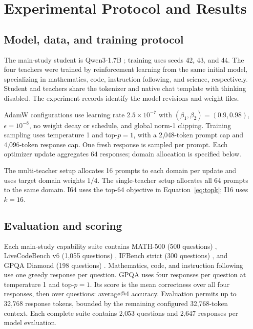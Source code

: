 \section{Experimental Protocol and Results}
\label{app:setup}

\subsection{Model, data, and training protocol}

The main-study student is Qwen3-1.7B \citep{qwen2025qwen3}; training uses seeds 42, 43, and 44. The four teachers were trained by reinforcement learning from the same initial model, specializing in mathematics, code, instruction following, and science, respectively. Student and teachers share the tokenizer and native chat template with thinking disabled. The experiment records identify the model revisions and weight files.

AdamW configurations use learning rate $2.5\times10^{-7}$ with $(\beta_1,\beta_2)=(0.9,0.98)$, $\epsilon=10^{-8}$, no weight decay or schedule, and global norm-1 clipping. Training sampling uses temperature 1 and top-$p=1$, with a 2,048-token prompt cap and 4,096-token response cap. One fresh response is sampled per prompt. Each optimizer update aggregates 64 responses; domain allocation is specified below.

The multi-teacher setup allocates 16 prompts to each domain per update and uses target domain weights $1/4$. The single-teacher setup allocates all 64 prompts to the same domain. I64 uses the top-$64$ objective in Equation~\ref{eq:topk}; I16 uses $k=16$.


\subsection{Evaluation and scoring}

Each main-study capability suite contains MATH-500 (500 questions) \citep{hendrycks2021math}, LiveCodeBench v6 (1,055 questions) \citep{jain2024livecodebench}, IFBench strict (300 questions) \citep{pyatkin2025ifbench}, and GPQA Diamond (198 questions) \citep{rein2023gpqa}. Mathematics, code, and instruction following use one greedy response per question. GPQA uses four responses per question at temperature 1 and top-$p=1$. Its score is the mean correctness over all four responses, then over questions: average@4 accuracy. Evaluation permits up to 32,768 response tokens, bounded by the remaining configured 32,768-token context. Each complete suite contains 2,053 questions and 2,647 responses per model evaluation.

